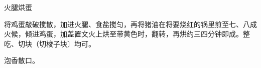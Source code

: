 \begin{recipe}{火腿烘蛋}

\ingredients


\cooking

将鸡蛋敲破搅散，加进火腿、食盐搅匀，再将猪油在将要烧红的锅里煎至七、八成火候，倾进鸡蛋，加盖置文火上烘至带黄色时，翻转，再烘约三四分钟即成。整吃、切块（切梭子块〕均可。

\notes

泡香散口。

\end{recipe}

